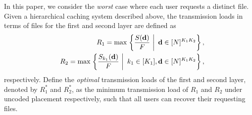 \documentclass[onecolumn,10pt]{IEEEtran}
\theoremstyle{mythm}
\begin{document}
\begin{itemize}
\begin{itemize}
    \end{itemize}
\end{itemize}

In this paper, we consider the \emph{worst} case where each user requests a distinct file. Given a hierarchical caching system described above, the transmission loads in terms of files for the first and second layer are defined as
\begin{eqnarray*}
&&R_1=  \max\left.\left\{\frac{S({\bf d})}{F}\ \right|\ {\bf d}\in [N]^{K_1K_2}\right\},\\
&&R_2=\max\left.\left\{ \frac{S_{k_1}({\bf d})}{F}\ \right|\ k_1\in[K_1],{\bf d}\in [N]^{K_1K_2}  \right \},
\end{eqnarray*}
respectively. Define the \emph{optimal} transmission loads of the first and second layer, denoted by  $R_1^*$ and $R_2^*$, as the minimum transmission load of $R_1$ and $R_2$ under uncoded placement respectively,  such that all users can recover their requesting files.
\end{document}
